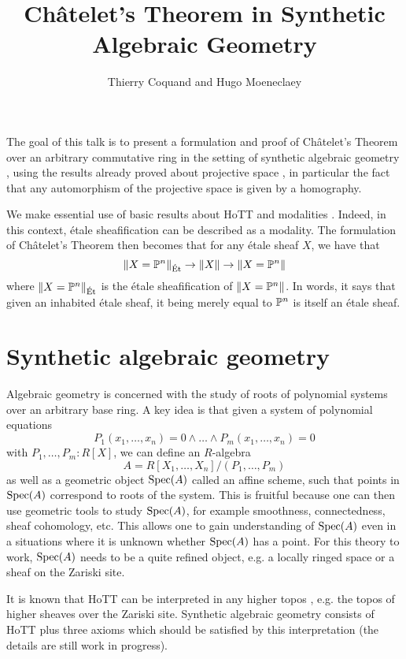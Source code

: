\documentclass{../util/zariski}
\title{Ch\^atelet's Theorem in Synthetic Algebraic Geometry}
\author{Thierry Coquand and Hugo Moeneclaey}
\begin{document}
\maketitle

The goal of this talk is to present a formulation and proof of Ch\^atelet's Theorem over an arbitrary commutative ring
in the setting of synthetic algebraic geometry \cite{draft}, using the results already proved about projective
space \cite{sag-projective}, in particular the fact that any automorphism of the projective space is given
by a homography. 

We make essential use of basic results about HoTT \cite{hott}
and modalities \cite{modalities}. Indeed, in this context, \'etale sheafification can be described
as a modality. The formulation of Ch\^atelet's Theorem then becomes that for any étale sheaf $X$, we have that
\[\lVert X=\mathbb{P}^n \rVert_{\mathrm{\acute{E}t}} \to \lVert X \rVert \to \lVert X=\mathbb{P}^n \rVert\]
where $\lVert X=\mathbb{P}^n \rVert_{\mathrm{\acute{E}t}}$ is the étale sheafification of $\lVert X=\mathbb{P}^n \rVert$. In words, it says that given an inhabited étale sheaf, it being merely equal to $\mathbb{P}^n$ is itself an étale sheaf.


\section{Synthetic algebraic geometry}

Algebraic geometry is concerned with the study of roots of polynomial systems over an arbitrary base ring. A key idea is that given a system of polynomial equations
\[P_1(x_1,\ldots,x_n)=0\land\ldots\land P_m(x_1,\ldots,x_n)=0\]
with $P_1,\ldots,P_m:R[X]$, we can define an $R$-algebra
\[A = R[X_1,\ldots,X_n]/(P_1,\ldots,P_m)\]
as well as a geometric object $\operatorname{Spec}(A)$ called an affine scheme, such that points in $\operatorname{Spec}(A)$ correspond to roots of the system. This is fruitful because one can then use geometric tools to study $\operatorname{Spec}(A)$, for example smoothness, connectedness, sheaf cohomology, etc. This allows one to gain understanding of $\operatorname{Spec}(A)$ even in a situations where it is unknown whether $\operatorname{Spec}(A)$ has a point. For this theory to work, $\operatorname{Spec}(A)$ needs to be a quite refined object, e.g. a locally ringed space or a sheaf on the Zariski site.

It is known that HoTT can be interpreted in any higher topos \cite{shulman2019all}, e.g. the topos of higher sheaves over the Zariski site. Synthetic algebraic geometry consists of HoTT plus three axioms which should be satisfied by this interpretation (the details are still work in progress).
\end{document}
